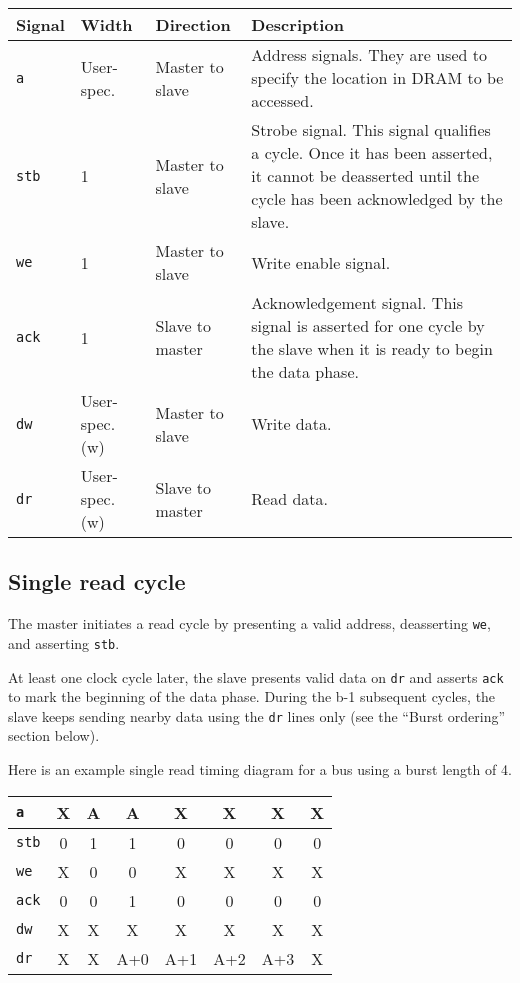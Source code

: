 \documentclass[a4paper,11pt]{article}
\begin{document}
\begin{tabular}{|l|l|l|p{7.5cm}|}
\hline
\bf{Signal} & \bf{Width} & \bf{Direction} & \bf{Description} \\
\hline
\verb!a! & User-spec. & Master to slave & Address signals. They are used to specify the location in DRAM to be accessed. \\
\hline
\verb!stb! & 1 & Master to slave & Strobe signal. This signal qualifies a cycle. Once it has been asserted, it cannot be deasserted until the cycle has been acknowledged by the slave. \\
\hline
\verb!we! & 1 & Master to slave & Write enable signal. \\
\hline
\verb!ack! & 1 & Slave to master & Acknowledgement signal. This signal is asserted for one cycle by the slave when it is ready to begin the data phase. \\
\hline
\verb!dw! & User-spec. (w) & Master to slave & Write data. \\
\hline
\verb!dr! & User-spec. (w) & Slave to master & Read data. \\
\hline
\end{tabular}

\subsection{Single read cycle}
The master initiates a read cycle by presenting a valid address, deasserting \verb!we!, and asserting \verb!stb!.

At least one clock cycle later, the slave presents valid data on \verb!dr! and asserts \verb!ack! to mark the beginning of the data phase. During the b-1 subsequent cycles, the slave keeps sending nearby data using the \verb!dr! lines only (see the ``Burst ordering'' section below).

Here is an example single read timing diagram for a bus using a burst length of 4.

\begin{tabular}{|l|c|c|c|c|c|c|c|}
\hline
\verb!a! & X & A & A & X & X & X & X \\
\hline
\verb!stb! & 0 & 1 & 1 & 0 & 0 & 0 & 0 \\
\hline
\verb!we! & X & 0 & 0 & X & X & X & X \\
\hline
\verb!ack! & 0 & 0 & 1 & 0 & 0 & 0 & 0 \\
\hline
\verb!dw! & X & X & X & X & X & X & X \\
\hline
\verb!dr! & X & X & A+0 & A+1 & A+2 & A+3 & X \\
\hline
\end{tabular}
\end{document}
